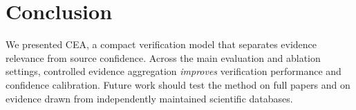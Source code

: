 \section{Conclusion}

We presented CEA, a compact verification model that separates evidence relevance from
source confidence. Across the main evaluation and ablation settings, controlled
evidence aggregation \emph{improves} verification performance and confidence
calibration. Future work should test the method on full papers and on evidence drawn
from independently maintained scientific databases.
